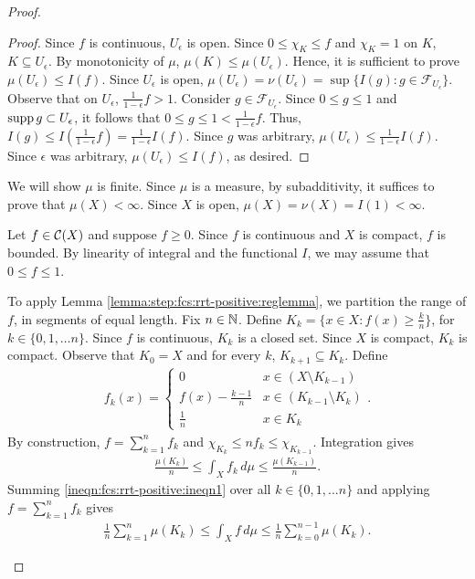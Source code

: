 \begin{proof}
\begin{step}
\begin{proof}
Since $f$ is continuous, $U_\epsilon$ is open. Since $0 \leq \chi_K \leq f$ and $\chi_K = 1$ on $K$, $K \subseteq U_\epsilon$. By monotonicity of $\mu$, $\mu(K) \leq \mu(U_\epsilon)$. Hence, it is sufficient to prove $\mu(U_\epsilon) \leq I(f)$. Since $U_\epsilon$ is open, $\mu(U_\epsilon) = \nu(U_\epsilon) = \sup \{ I(g) : g \in \mathcal{F}_{U_\epsilon} \}$. Observe that on $U_\epsilon$, $\frac{1}{1 - \epsilon} f > 1$.
 Consider $g \in \mathcal{F}_{U_\epsilon}$. Since $0 \leq g \leq 1$ and $\operatorname{supp} g \subset U_\epsilon$, it follows that $0 \leq g \leq 1 < \frac{1}{1 - \epsilon} f$. Thus, $I(g) \leq I (\frac{1}{1 - \epsilon} f) = \frac{1}{1 - \epsilon} I(f).$
 Since $g$ was arbitrary, $\mu(U_\epsilon) \leq \frac{1}{1 - \epsilon} I(f)$. Since $\epsilon$ was arbitrary, $\mu(U_\epsilon) \leq I(f)$, as desired.
 
\end{proof}
\end{step}
\begin{step}[$\mu$ is finite]
We will show $\mu$ is finite. Since $\mu$ is a measure, by subadditivity, it suffices to prove that $\mu(X) < \infty$.
Since $X$ is open, $\mu(X) = \nu(X) = I(1) < \infty$.
\end{step}

\begin{step}
Let $f \in {\mathcal C}(X)$ and suppose $f \geq 0$. Since $f$ is continuous and $X$ is compact, $f$ is bounded.
By linearity of integral and the functional $I$, we may assume that $0 \leq f \leq 1$.

To apply Lemma \ref{lemma:step:fcs:rrt-positive:reglemma}, we partition the range of $f$, in segments of equal length.
Fix $n \in {\mathbb N}$. Define $K_k = \{ x \in X : f(x) \geq \frac{k}{n} \}$, for $k \in \{ 0, 1, \ldots n \}$. Since $f$ is continuous, $K_k$ is a closed set. Since $X$ is compact, $K_k$ is compact. Observe that $K_0 = X$ and for every $k$, $K_{k + 1} \subseteq K_k$.
Define \begin{align*}
  f_k(x) =
  \begin{cases}
       0                      & x \in (X \setminus K_{k-1}) \\
       f(x) - \frac{k - 1}{n} & x \in (K_{k-1} \setminus K_k) \\
       \frac{1}{n}            & x \in K_k
  \end{cases}.
\end{align*}
By construction, $f = \sum_{k = 1}^n f_k$ and $\chi_{K_k} \leq n f_k \leq \chi_{K_{k-1}}$.
Integration gives \begin{align}
    \label{ineqn:fcs:rrt-positive:ineqn1}
    \frac{\mu(K_k)}{n} \leq \int_{X} f_k \,d\mu \leq \frac{\mu(K_{k-1})}{n}.
\end{align}
Summing \ref{ineqn:fcs:rrt-positive:ineqn1} over all $k \in \{ 0, 1, \ldots n \}$ and applying $f = \sum_{k = 1}^n f_k$ gives \begin{align}
     \label{ineqn:fcs:rrt-positive:ineqn2}
     \frac{1}{n} \sum_{k=1}^n \mu(K_k) \leq \int_{X} f \,d\mu \leq \frac{1}{n} \sum_{k=0}^{n-1} \mu(K_k).
\end{align}


\end{step}
\end{proof}
